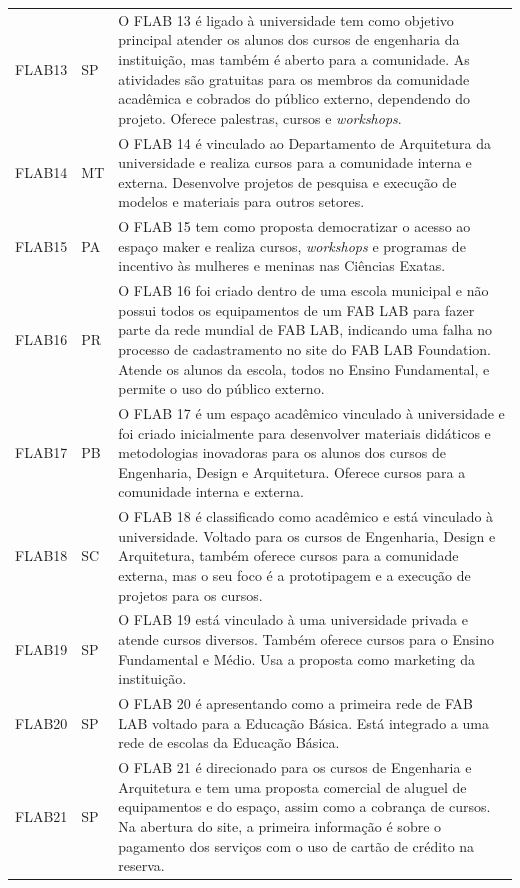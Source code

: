 \documentclass[portuguese]{textolivre}
\begin{document}
\begin{footnotesize}
\begin{longtable}{p{1cm} p{1cm} p{11.5cm}}
FLAB13 & SP & O FLAB 13 é ligado à universidade tem como objetivo principal atender os alunos dos cursos de engenharia da instituição, mas também é aberto para a comunidade. As atividades são gratuitas para os membros da comunidade acadêmica e cobrados do público externo, dependendo do projeto. Oferece palestras, cursos e \textit{workshops}. \\
FLAB14 & MT & O FLAB 14 é vinculado ao Departamento de Arquitetura da universidade e realiza cursos para a comunidade interna e externa. Desenvolve projetos de pesquisa e execução de modelos e materiais para outros setores. \\
FLAB15 & PA & O FLAB 15 tem como proposta democratizar o acesso ao espaço maker e realiza cursos, \textit{workshops} e programas de incentivo às mulheres e meninas nas Ciências Exatas. \\
FLAB16 & PR & O FLAB 16 foi criado dentro de uma escola municipal e não possui todos os equipamentos de um FAB LAB para fazer parte da rede mundial de FAB LAB, indicando uma falha no processo de cadastramento no site do FAB LAB Foundation. Atende os alunos da escola, todos no Ensino Fundamental, e permite o uso do público externo. \\
FLAB17 & PB & O FLAB 17 é um espaço acadêmico vinculado à universidade e foi criado inicialmente para desenvolver materiais didáticos e metodologias inovadoras para os alunos dos cursos de Engenharia, Design e Arquitetura. Oferece cursos para a comunidade interna e externa. \\
FLAB18 & SC & O FLAB 18 é classificado como acadêmico e está vinculado à universidade. Voltado para os cursos de Engenharia, Design e Arquitetura, também oferece cursos para a comunidade externa, mas o seu foco é a prototipagem e a execução de projetos para os cursos. \\
FLAB19 & SP & O FLAB 19 está vinculado à uma universidade privada e atende cursos diversos. Também oferece cursos para o Ensino Fundamental e Médio. Usa a proposta como marketing da instituição. \\
FLAB20 & SP & O FLAB 20 é apresentando como a primeira rede de FAB LAB voltado para a Educação Básica. Está integrado a uma rede de escolas da Educação Básica. \\
FLAB21 & SP & O FLAB 21 é direcionado para os cursos de Engenharia e Arquitetura e tem uma proposta comercial de aluguel de equipamentos e do espaço, assim como a cobrança de cursos. Na abertura do site, a primeira informação é sobre o pagamento dos serviços com o uso de cartão de crédito na reserva. \\

\end{longtable}
\end{footnotesize}
\end{document}
